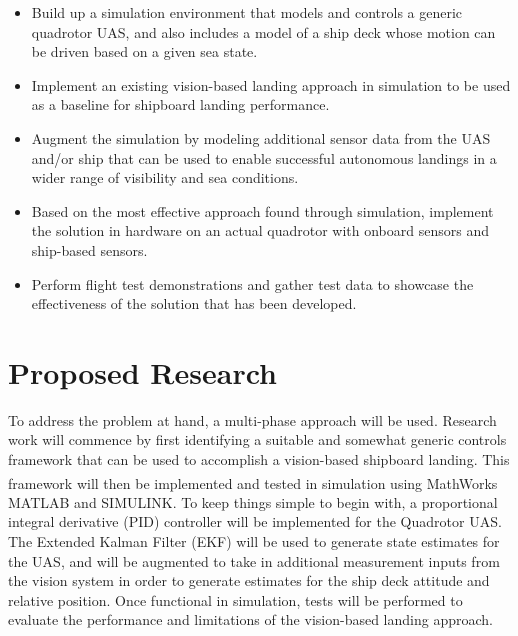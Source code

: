 \documentclass[12pt, letterpaper]{article}
\begin{document}
\begin{itemize}

	\item Build up a simulation environment that models and controls a generic quadrotor UAS, and also includes a model of a ship deck whose motion can be driven based on a given sea state.

	\item Implement an existing vision-based landing approach in simulation to be used as a baseline for shipboard landing performance.  

	\item Augment the simulation by modeling additional sensor data from the UAS and/or ship that can be used to enable successful autonomous landings in a wider range of visibility and sea conditions.

	\item Based on the most effective approach found through simulation, implement the solution in hardware on an actual quadrotor with onboard sensors and ship-based sensors.
	
	\item Perform flight test demonstrations and gather test data to showcase the effectiveness of the solution that has been developed.

\end{itemize}

\section{Proposed Research}

To address the problem at hand, a multi-phase approach will be used.  Research work will commence by first identifying a suitable and somewhat generic controls framework that can be used to accomplish a vision-based shipboard landing.  This framework will then be implemented and tested in simulation using MathWorks\textsuperscript{\textregistered} MATLAB and SIMULINK.  To keep things simple to begin with, a proportional integral derivative (PID) controller will be implemented for the Quadrotor UAS.  The Extended Kalman Filter (EKF) will be used to generate state estimates for the UAS, and will be augmented to take in additional measurement inputs from the vision system in order to generate estimates for the ship deck attitude and relative position.  Once functional in simulation, tests will be performed to evaluate the performance and limitations of the vision-based landing approach.
\end{document}
